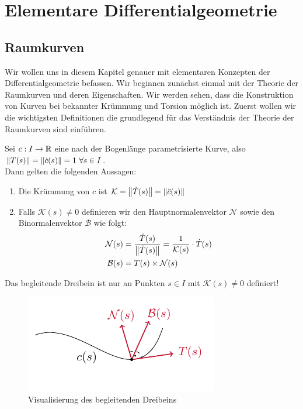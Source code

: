 \chapter{Elementare Differentialgeometrie}
\section{Raumkurven}
Wir wollen uns in diesem Kapitel genauer mit elementaren Konzepten der Differentialgeometrie befassen. Wir beginnen zunächst einmal mit der Theorie der Raumkurven und deren Eigenschaften. Wir werden sehen, dass die Konstruktion von Kurven bei bekannter Krümmung und Torsion möglich ist. Zuerst wollen wir die  wichtigsten Definitionen die grundlegend für das Verständnis der Theorie der Raumkurven sind einführen.
\begin{defs}
	Sei $c: I \rightarrow \mathbb{R}$ eine nach der Bogenlänge parametrisierte Kurve, also $\norm{T(s)} = \norm{\dot{c}(s)} = 1 \ \forall s \in I$. \\
	Dann gelten die folgenden Aussagen:
\begin{enumerate}
	\item Die Krümmung von $c$ ist $\mathcal{K} = \norm{\dot{T}(s)} = \norm{\ddot{c}(s)}$
	\item Falls $\mathcal{K}(s) \neq 0$ definieren wir den Hauptnormalenvektor $\mathcal{N}$ sowie den Binormalenvektor $\mathcal{B}$ wie folgt:
	\begin{align}
	\mathcal{N}(s) &= \frac{\dot{T}(s)}{\norm{\dot{T}(s)}} = \frac{1}{\mathcal{K}(s)}\cdot\dot{T}(s) \\
		 \mathcal{B}(s) &= T(s) \times \mathcal{N}(s)
	\end{align}
\end{enumerate}
\end{defs}

\begin{bem}
	Das begleitende Dreibein ist nur an Punkten $s \in I$ mit $\mathcal{K}(s) \neq 0$ definiert!
\end{bem}
\begin{figure}[H]
	\centering
	\includegraphics[scale=1.2]{figures/tikz/dreibein.pdf}
	\caption{Visualisierung des begleitenden Dreibeins}
\end{figure}

